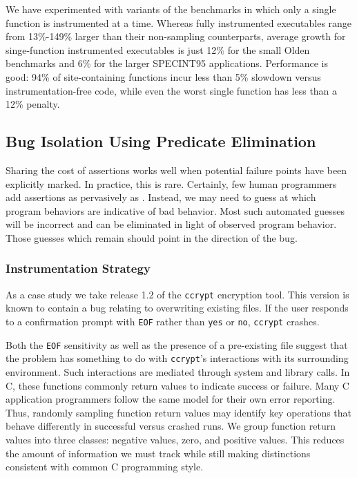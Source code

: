 We have experimented with variants of the \CCured benchmarks in which
only a single function is instrumented at a time.  Whereas fully
instrumented executables range from 13\%-149\% larger than their
non-sampling counterparts, average growth for singe-function
instrumented executables is just 12\% for the small Olden benchmarks
and 6\% for the larger SPECINT95 applications.  Performance is good:
94\% of site-containing functions incur less than 5\% slowdown versus
instrumentation-free code, while even the worst single function has
less than a 12\% penalty.

\subsection{Bug Isolation Using Predicate Elimination}
\label{sec:ccrypt}

Sharing the cost of assertions works well when potential failure
points have been explicitly marked.  In practice, this is rare.
Certainly, few human programmers add assertions as pervasively as
\CCured.  Instead, we may need to guess at which program behaviors are
indicative of bad behavior.  Most such automated guesses will be
incorrect and can be eliminated in light of observed program behavior.
Those guesses which remain should point in the direction of the bug.

\subsubsection{Instrumentation Strategy}

As a case study we take release 1.2 of the \texttt{ccrypt} encryption
tool.  This version is known to contain a bug relating to overwriting
existing files.  If the user responds to a confirmation prompt with
\texttt{EOF} rather than \texttt{yes} or \texttt{no}, \texttt{ccrypt}
crashes.

Both the \texttt{EOF} sensitivity as well as the presence of a
pre-existing file suggest that the problem has something to do with
\texttt{ccrypt}'s interactions with its surrounding environment.  Such
interactions are mediated through system and library calls.  In C,
these functions commonly return values to indicate success or failure.
Many C application programmers follow the same model for their own
error reporting.  Thus, randomly sampling function return values may
identify key operations that behave differently in successful versus
crashed runs.  We group function return values into three classes:
negative values, zero, and positive values.  This reduces the amount
of information we must track while still making distinctions
consistent with common C programming style.

